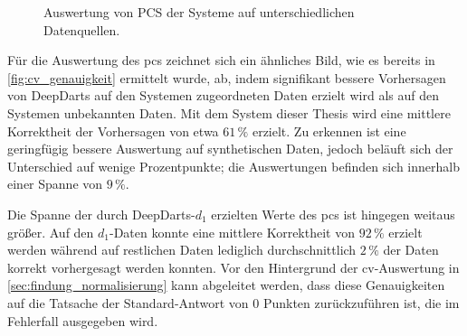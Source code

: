 \begin{figure}
    \centering
    \caption{Auswertung von PCS der Systeme auf unterschiedlichen Datenquellen.}
    \label{fig:nn_pcs}
\end{figure}

Für die Auswertung des \ac{pcs} zeichnet sich ein ähnliches Bild, wie es bereits in \autoref{fig:cv_genauigkeit} ermittelt wurde, ab, indem signifikant bessere Vorhersagen von DeepDarts auf den Systemen zugeordneten Daten erzielt wird als auf den Systemen unbekannten Daten. Mit dem System dieser Thesis wird eine mittlere Korrektheit der Vorhersagen von etwa $61\,\%$ erzielt. Zu erkennen ist eine geringfügig bessere Auswertung auf synthetischen Daten, jedoch beläuft sich der Unterschied auf wenige Prozentpunkte; die Auswertungen befinden sich innerhalb einer Spanne von $9\,\%$.

Die Spanne der durch DeepDarts-$d_1$ erzielten Werte des \ac{pcs} ist hingegen weitaus größer. Auf den $d_1$-Daten konnte eine mittlere Korrektheit von $92\,\%$ erzielt werden während auf restlichen Daten lediglich durchschnittlich $2\,\%$ der Daten korrekt vorhergesagt werden konnten. Vor den Hintergrund der \ac{cv}-Auswertung in \autoref{sec:findung_normalisierung} kann abgeleitet werden, dass diese Genauigkeiten auf die Tatsache der Standard-Antwort von 0 Punkten zurückzuführen ist, die im Fehlerfall ausgegeben wird.


